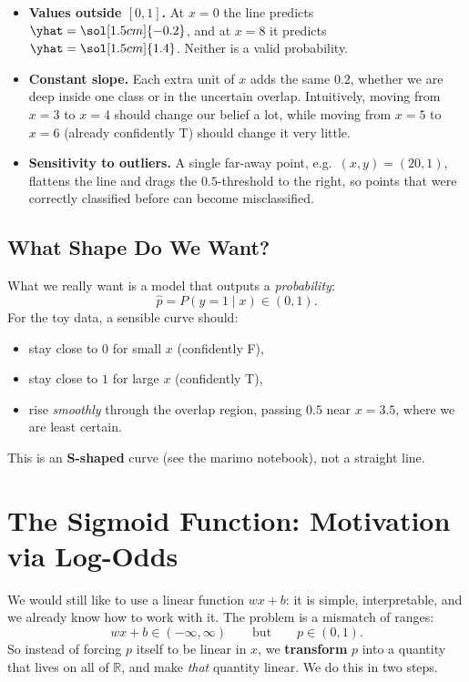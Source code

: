 \documentclass[12pt, a4paper]{article}
\begin{document}
\begin{itemize}
  \item \textbf{Values outside $[0, 1]$.}
        At $x = 0$ the line predicts $\yhat = \sol[1.5cm]{-0.2}$, and at $x = 8$ it
        predicts $\yhat = \sol[1.5cm]{1.4}$.
        Neither is a valid probability.
  \item \textbf{Constant slope.}
        Each extra unit of $x$ adds the same $0.2$, whether we are deep inside
        one class or in the uncertain overlap.
        Intuitively, moving from $x = 3$ to $x = 4$ should change our belief a lot,
        while moving from $x = 5$ to $x = 6$ (already confidently T) should change
        it very little.
  \item \textbf{Sensitivity to outliers.}
        A single far-away point, e.g.\ $(x, y) = (20, 1)$, flattens the line
        and drags the $0.5$-threshold to the right, so points that were
        correctly classified before can become misclassified.
\end{itemize}

\subsection{What Shape Do We Want?}

What we really want is a model that outputs a \emph{probability}:
\[
  \hat{p} = P(y = 1 \mid x) \in (0, 1).
\]
For the toy data, a sensible curve should:
\begin{itemize}[nosep]
  \item stay close to $0$ for small $x$ (confidently F),
  \item stay close to $1$ for large $x$ (confidently T),
  \item rise \emph{smoothly} through the overlap region, passing $0.5$ near
        $x = 3.5$, where we are least certain.
\end{itemize}
This is an \textbf{S-shaped} curve (see the marimo notebook), not a
straight line.


\section{The Sigmoid Function: Motivation via Log-Odds}

We would still like to use a linear function $wx + b$: it is simple,
interpretable, and we already know how to work with it.
The problem is a mismatch of ranges:
\[
  wx + b \in (-\infty, \infty)
  \qquad \text{but} \qquad
  p \in (0, 1).
\]
So instead of forcing $p$ itself to be linear in $x$, we \textbf{transform}
$p$ into a quantity that lives on all of $\mathbb{R}$, and make
\emph{that} quantity linear.
We do this in two steps.
\end{document}
